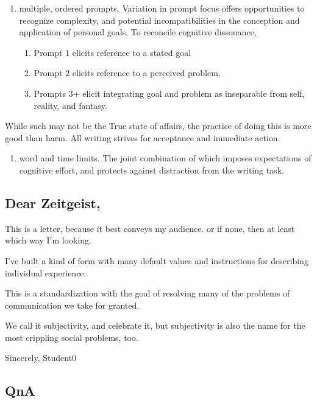 \documentclass[
]{book}
\providecommand{\tightlist}{%
  \setlength{\itemsep}{0pt}\setlength{\parskip}{0pt}}
\begin{document}
\begin{enumerate}
\def\labelenumi{\arabic{enumi}.}
\tightlist
\item
  multiple, ordered prompts. Variation in prompt focus offers opportunities to recognize complexity, and potential incompatibilities in the conception and application of personal goals. To reconcile cognitive dissonance,

  \begin{enumerate}
  \def\labelenumii{\arabic{enumii}.}
  \tightlist
  \item
    Prompt 1 elicits reference to a stated goal
  \item
    Prompt 2 elicits reference to a perceived problem.
  \item
    Prompts 3+ elicit integrating goal and problem as inseparable from self, reality, and fantasy.
  \end{enumerate}
\end{enumerate}

While such may not be the True state of affairs, the practice of doing this is more good than harm. All writing strives for acceptance and immediate action.

\begin{enumerate}
\def\labelenumi{\arabic{enumi}.}
\setcounter{enumi}{1}
\tightlist
\item
  word and time limits. The joint combination of which imposes expectations of cognitive effort, and protects against distraction from the writing task.
\end{enumerate}

\hypertarget{dear-zeitgeist}{%
\subsection{Dear Zeitgeist,}\label{dear-zeitgeist}}

This is a letter, because it best conveys my audience. or if none,
then at least which way I'm looking.

I've built a kind of form with many default values and
instructions for describing individual experience.

This is a standardization with the goal of resolving many of the problems of communication we take for granted.

We call it subjectivity, and celebrate it, but subjectivity is also the name for the most crippling social problems, too.

Sincerely,
Student0

\hypertarget{qna}{%
\subsection{QnA}\label{qna}}
\end{document}
